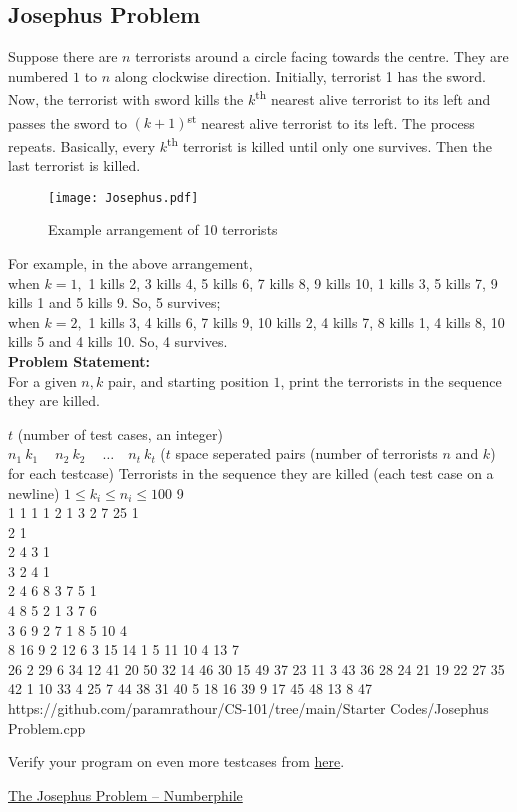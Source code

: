 \subsection{Josephus Problem}
Suppose there are $n$ terrorists around a circle facing towards the centre. They are numbered $1$ to $n$ along clockwise direction. Initially, terrorist 1 has the sword. Now, the terrorist with sword kills the $k$\textsuperscript{th} nearest alive terrorist to its left and passes the sword to $(k+1)$\textsuperscript{st} nearest alive terrorist to its left. The process repeats. Basically, every $k$\textsuperscript{th} terrorist is killed until only one survives. Then the last terrorist is killed.
\begin{figure}[H]
    \centering
    \texttt{[image: Josephus.pdf]}
    \caption{Example arrangement of 10 terrorists}
    \label{fig:jp}
\end{figure}
\vspace{-1.5em}
For example, in the above arrangement,\\
when $k=1,$ 1 kills 2, 3 kills 4, 5 kills 6, 7 kills 8, 9 kills 10, 1 kills 3, 5 kills 7, 9 kills 1 and 5 kills 9. So, 5 survives;\\%
when $k=2,$ 1 kills 3, 4 kills 6, 7 kills 9, 10 kills 2, 4 kills 7, 8 kills 1, 4 kills 8, 10 kills 5 and 4 kills 10. So, 4 survives.\\%
\textbf{Problem Statement:}\\
For a given $n, k$ pair, and starting position $1$, print the terrorists in the sequence they are killed.
\begin{testcases}
	{$t$ \hfill(number of test cases, an integer)\\
	$n_1\ k_1\ \quad n_2\ k_2\ \quad \ldots\quad n_t\ k_t$ \hfill($t$ space seperated pairs (number of terrorists $n$ and $k$) for each testcase)}
	{Terrorists in the sequence they are killed \hfill(each test case on a newline)}
	{$1 \leq k_i \leq n_i \leq 100$}
	{9\\1 1 1 1 2 1 3 2 7 25}
	{1\\2 1\\2 4 3 1\\3 2 4 1\\2 4 6 8 3 7 5 1\\4 8 5 2 1 3 7 6\\3 6 9 2 7 1 8 5 10 4\\8 16 9 2 12 6 3 15 14 1 5 11 10 4 13 7\\26 2 29 6 34 12 41 20 50 32 14 46 30 15 49 37 23 11 3 43 36 28 24 21 19 22 27 35 42 1 10 33 4 25 7 44 38 31 40 5 18 16 39 9 17 45 48 13 8 47}
	{https://github.com/paramrathour/CS-101/tree/main/Starter Codes/Josephus Problem.cpp}
\end{testcases}
\begin{note}
	Verify your program on even more testcases from \href{https://cses.fi/problemset/task/2163/}{here}.
\end{note}
\begin{funvideo}
	\href{https://youtu.be/uCsD3ZGzMgE}{The Josephus Problem -- Numberphile}
\end{funvideo}